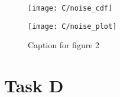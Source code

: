 \documentclass[11pt]{article}
\begin{document}
\begin{figure}[ht]
    \centering
    \begin{minipage}{0.5\textwidth}
        \centering
        \texttt{[image: C/noise\_cdf]} %
    \end{minipage}%
    \begin{minipage}{0.5\textwidth}
        \centering
        \texttt{[image: C/noise\_plot]} %
    \end{minipage}
    \caption{Caption for figure 2}
    \label{fig:C_noise_distribution}
\end{figure}

\section{Task D}
\end{document}

